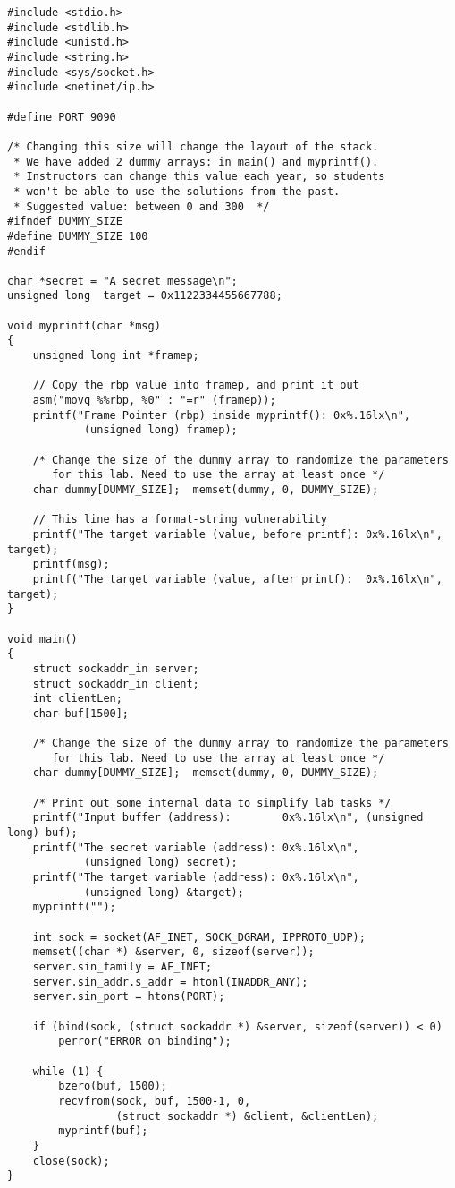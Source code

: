 \begin{lstlisting}[label=format:code:server, caption={The vulnerable server program
             \texttt{server.c} (can be downloaded from the lab's website)}]
#include <stdio.h>
#include <stdlib.h>
#include <unistd.h>
#include <string.h>
#include <sys/socket.h>
#include <netinet/ip.h>

#define PORT 9090

/* Changing this size will change the layout of the stack.
 * We have added 2 dummy arrays: in main() and myprintf().
 * Instructors can change this value each year, so students 
 * won't be able to use the solutions from the past.   
 * Suggested value: between 0 and 300  */
#ifndef DUMMY_SIZE
#define DUMMY_SIZE 100
#endif

char *secret = "A secret message\n";
unsigned long  target = 0x1122334455667788;

void myprintf(char *msg)
{
    unsigned long int *framep;

    // Copy the rbp value into framep, and print it out
    asm("movq %%rbp, %0" : "=r" (framep));
    printf("Frame Pointer (rbp) inside myprintf(): 0x%.16lx\n", 
            (unsigned long) framep);

    /* Change the size of the dummy array to randomize the parameters 
       for this lab. Need to use the array at least once */
    char dummy[DUMMY_SIZE];  memset(dummy, 0, DUMMY_SIZE);

    // This line has a format-string vulnerability
    printf("The target variable (value, before printf): 0x%.16lx\n", target);
    printf(msg);
    printf("The target variable (value, after printf):  0x%.16lx\n", target);
}

void main()
{
    struct sockaddr_in server;
    struct sockaddr_in client;
    int clientLen;
    char buf[1500];

    /* Change the size of the dummy array to randomize the parameters
       for this lab. Need to use the array at least once */
    char dummy[DUMMY_SIZE];  memset(dummy, 0, DUMMY_SIZE);

    /* Print out some internal data to simplify lab tasks */
    printf("Input buffer (address):        0x%.16lx\n", (unsigned long) buf);
    printf("The secret variable (address): 0x%.16lx\n", 
            (unsigned long) secret);
    printf("The target variable (address): 0x%.16lx\n", 
            (unsigned long) &target);
    myprintf("");

    int sock = socket(AF_INET, SOCK_DGRAM, IPPROTO_UDP);
    memset((char *) &server, 0, sizeof(server));
    server.sin_family = AF_INET;
    server.sin_addr.s_addr = htonl(INADDR_ANY);
    server.sin_port = htons(PORT);

    if (bind(sock, (struct sockaddr *) &server, sizeof(server)) < 0)
        perror("ERROR on binding");

    while (1) {
        bzero(buf, 1500);
        recvfrom(sock, buf, 1500-1, 0,
                 (struct sockaddr *) &client, &clientLen);
        myprintf(buf);
    }
    close(sock);
}
\end{lstlisting}


